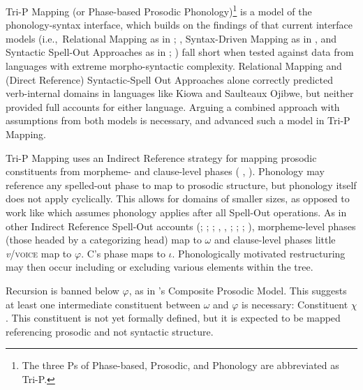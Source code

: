 \documentclass[output=paper]{langscibook}
\begin{document}
Tri-P Mapping (or Phase-based Prosodic Phonology)\footnote{The three Ps of Phase-based, Prosodic, and Phonology are abbreviated as Tri-P.} is a model of the phonology-syntax interface, which builds on the findings of \citet{Miller:2018} that current interface models \mbox{(i.e., Relational} Mapping as in \citealt{NesporVogel:1986}; \citealt{Vogel:2019}, Syntax-Driven Mapping as in \citealt{Selkirk:2011}, and Syntactic Spell-Out Approaches as in \citealt{sato:2006,Pak:2008}; \mbox{\citealt{samuels:2011}}) fall short when tested against data from languages with extreme morpho-syntactic complexity. Relational Mapping and (Direct Reference) Syntactic-Spell Out Approaches alone correctly predicted verb-internal domains in languages like Kiowa and Saulteaux Ojibwe, but neither provided full accounts for either language. Arguing a combined approach with assumptions from both models is necessary, and \citet{Miller:2018, Miller:2020} advanced such a model in Tri-P Mapping.

Tri-P Mapping uses an Indirect Reference strategy for mapping prosodic constituents from morpheme- and clause-level phases (\citeauthor{Miller:2018} \citeyear{Miller:2018}, \citeyear{Miller:2020}). Phonology may reference any spelled-out phase to map to prosodic structure, but phonology itself does not apply cyclically. This allows for domains of smaller sizes, as opposed to work like {\citet{cheng2016}} which assumes phonology applies after all Spell-Out operations. As in other Indirect Reference Spell-Out accounts (\citealt{ahn2015}; \mbox{\citealt{cheng2007}}; \citealt{compton2007}; \citeauthor{dobashi2003}  \citeyear{dobashi2003}, \citeyear{dobashi2004a}, \citeyear{dobashi2004restructuring}; \citealt{ishihara2007}; \mbox{\citealt{kratzer2007}}; \citealt{piggott2006}), mor\-pheme-level phases (those headed by a categorizing head) map to $\omega$ and clause-level phases little \textit{v}/\textsc{voice} map to $\varphi$. C's phase maps to $\iota$. Phonologically motivated restructuring may then occur including or excluding various elements within the tree.

Recursion is banned below $\varphi$, as in 's Composite Prosodic Model. This suggests at least one intermediate constituent between $\omega$ and $\varphi$ is necessary: Constituent $\chi$. This constituent is not yet formally defined, but it is expected to be mapped referencing prosodic and not syntactic structure.
\end{document}
